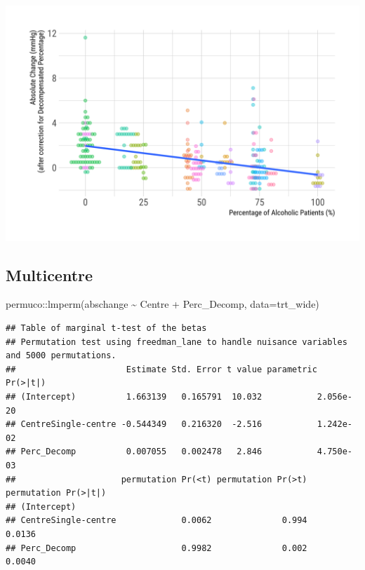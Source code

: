 \documentclass[
]{article}
\newenvironment{Shaded}{\begin{snugshade}}{\end{snugshade}}
\newcommand{\AttributeTok}[1]{\textcolor[rgb]{0.77,0.63,0.00}{#1}}
\newcommand{\FunctionTok}[1]{\textcolor[rgb]{0.00,0.00,0.00}{#1}}
\newcommand{\NormalTok}[1]{#1}
\newcommand{\SpecialCharTok}[1]{\textcolor[rgb]{0.00,0.00,0.00}{#1}}
\begin{document}
\includegraphics{figures/unnamed-chunk-38-1.png}

\hypertarget{multicentre}{%
\subsection{Multicentre}\label{multicentre}}

\begin{Shaded}
\begin{Highlighting}[]
\NormalTok{permuco}\SpecialCharTok{::}\FunctionTok{lmperm}\NormalTok{(abschange }\SpecialCharTok{\textasciitilde{}}\NormalTok{ Centre }\SpecialCharTok{+}\NormalTok{ Perc\_Decomp, }\AttributeTok{data=}\NormalTok{trt\_wide)}
\end{Highlighting}
\end{Shaded}

\begin{verbatim}
## Table of marginal t-test of the betas
## Permutation test using freedman_lane to handle nuisance variables and 5000 permutations.
##                      Estimate Std. Error t value parametric Pr(>|t|)
## (Intercept)          1.663139   0.165791  10.032           2.056e-20
## CentreSingle-centre -0.544349   0.216320  -2.516           1.242e-02
## Perc_Decomp          0.007055   0.002478   2.846           4.750e-03
##                     permutation Pr(<t) permutation Pr(>t) permutation Pr(>|t|)
## (Intercept)                                                                   
## CentreSingle-centre             0.0062              0.994               0.0136
## Perc_Decomp                     0.9982              0.002               0.0040
\end{verbatim}
\end{document}
